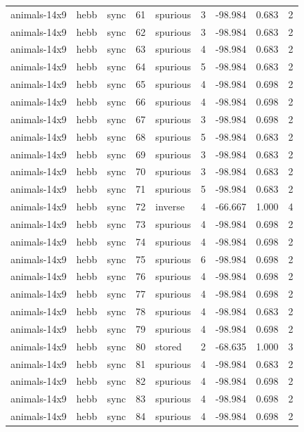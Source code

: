 \begin{tabular}{lllrlrrrr}
animals-14x9 & hebb & sync & 61 & spurious & 3 & -98.984 & 0.683 & 2 \\
animals-14x9 & hebb & sync & 62 & spurious & 3 & -98.984 & 0.683 & 2 \\
animals-14x9 & hebb & sync & 63 & spurious & 4 & -98.984 & 0.683 & 2 \\
animals-14x9 & hebb & sync & 64 & spurious & 5 & -98.984 & 0.683 & 2 \\
animals-14x9 & hebb & sync & 65 & spurious & 4 & -98.984 & 0.698 & 2 \\
animals-14x9 & hebb & sync & 66 & spurious & 4 & -98.984 & 0.698 & 2 \\
animals-14x9 & hebb & sync & 67 & spurious & 3 & -98.984 & 0.698 & 2 \\
animals-14x9 & hebb & sync & 68 & spurious & 5 & -98.984 & 0.683 & 2 \\
animals-14x9 & hebb & sync & 69 & spurious & 3 & -98.984 & 0.683 & 2 \\
animals-14x9 & hebb & sync & 70 & spurious & 3 & -98.984 & 0.683 & 2 \\
animals-14x9 & hebb & sync & 71 & spurious & 5 & -98.984 & 0.683 & 2 \\
animals-14x9 & hebb & sync & 72 & inverse & 4 & -66.667 & 1.000 & 4 \\
animals-14x9 & hebb & sync & 73 & spurious & 4 & -98.984 & 0.698 & 2 \\
animals-14x9 & hebb & sync & 74 & spurious & 4 & -98.984 & 0.698 & 2 \\
animals-14x9 & hebb & sync & 75 & spurious & 6 & -98.984 & 0.698 & 2 \\
animals-14x9 & hebb & sync & 76 & spurious & 4 & -98.984 & 0.698 & 2 \\
animals-14x9 & hebb & sync & 77 & spurious & 4 & -98.984 & 0.698 & 2 \\
animals-14x9 & hebb & sync & 78 & spurious & 4 & -98.984 & 0.683 & 2 \\
animals-14x9 & hebb & sync & 79 & spurious & 4 & -98.984 & 0.698 & 2 \\
animals-14x9 & hebb & sync & 80 & stored & 2 & -68.635 & 1.000 & 3 \\
animals-14x9 & hebb & sync & 81 & spurious & 4 & -98.984 & 0.683 & 2 \\
animals-14x9 & hebb & sync & 82 & spurious & 4 & -98.984 & 0.698 & 2 \\
animals-14x9 & hebb & sync & 83 & spurious & 4 & -98.984 & 0.698 & 2 \\
animals-14x9 & hebb & sync & 84 & spurious & 4 & -98.984 & 0.698 & 2 \\

\end{tabular}
